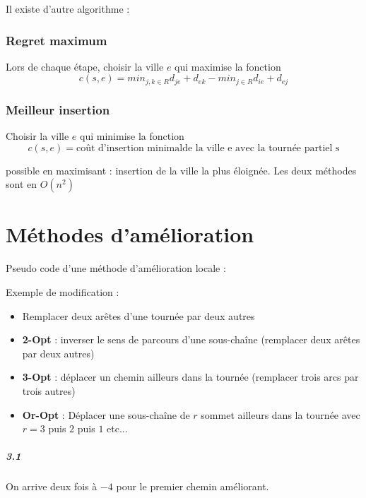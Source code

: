 \documentclass[11pt,a4paper]{report}
\begin{document}
Il existe d'autre algorithme :

\subsection{Regret maximum}
Lors de chaque étape, choisir la ville $e$ qui maximise la fonction
$$
c(s,e) = min_{j,k \in R}d_{je} + d_{ek} - min_{j \in R} d_{ie} + d_{ej}
$$ 

\subsection{Meilleur insertion}
Choisir la ville $e$ qui minimise la fonction
$$
c(s,e) = \text{coût d'insertion minimalde la ville e avec la tournée partiel s}
$$

possible en maximisant : insertion de la ville la plus éloignée. Les deux méthodes sont en $O(n^2)$


\chapter{Méthodes d'amélioration}

Pseudo code d'une méthode d'amélioration locale :

\begin{algorithm}[H]
\end{algorithm}

Exemple de modification :
\begin{itemize}
    \item Remplacer deux arêtes d'une tournée par deux autres
    \item \textbf{2-Opt} : inverser le sens de parcours d'une sous-chaîne (remplacer deux arêtes par deux autres)
    \item \textbf{3-Opt} : déplacer un chemin ailleurs dans la tournée (remplacer trois arcs par trois autres)
    \item \textbf{Or-Opt} : Déplacer une sous-chaîne de $r$ sommet ailleurs dans la tournée avec $r = 3$ puis $2$ puis $1$ etc...
\end{itemize}

\paragraph*{3.1} On arrive deux fois à $-4$ pour le premier chemin améliorant.
\end{document}
